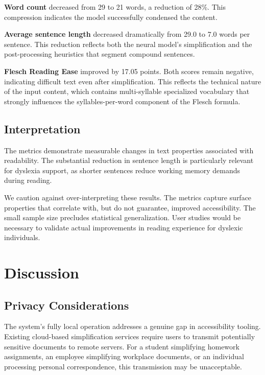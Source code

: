 \documentclass[11pt]{article}
\begin{document}
\textbf{Word count} decreased from 29 to 21 words, a reduction of 28\%. This compression indicates the model successfully condensed the content.

\textbf{Average sentence length} decreased dramatically from 29.0 to 7.0 words per sentence. This reduction reflects both the neural model's simplification and the post-processing heuristics that segment compound sentences.

\textbf{Flesch Reading Ease} improved by 17.05 points. Both scores remain negative, indicating difficult text even after simplification. This reflects the technical nature of the input content, which contains multi-syllable specialized vocabulary that strongly influences the syllables-per-word component of the Flesch formula.

\subsection{Interpretation}

The metrics demonstrate measurable changes in text properties associated with readability. The substantial reduction in sentence length is particularly relevant for dyslexia support, as shorter sentences reduce working memory demands during reading.

We caution against over-interpreting these results. The metrics capture surface properties that correlate with, but do not guarantee, improved accessibility. The small sample size precludes statistical generalization. User studies would be necessary to validate actual improvements in reading experience for dyslexic individuals.

\section{Discussion}

\subsection{Privacy Considerations}

The system's fully local operation addresses a genuine gap in accessibility tooling. Existing cloud-based simplification services require users to transmit potentially sensitive documents to remote servers. For a student simplifying homework assignments, an employee simplifying workplace documents, or an individual processing personal correspondence, this transmission may be unacceptable.
\end{document}
